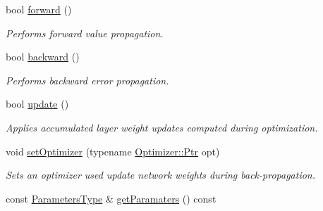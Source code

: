\begin{DoxyCompactItemize}
bool \hyperlink{classffnn_1_1layer_1_1_local_convolution_ad0f643595b7c35e669d41b77c68143df}{forward} ()
\begin{DoxyCompactList}\small\item\em Performs forward value propagation. \end{DoxyCompactList}\item 
bool \hyperlink{classffnn_1_1layer_1_1_local_convolution_aa59a3093b68dc8001eaff1f6eef72fc9}{backward} ()
\begin{DoxyCompactList}\small\item\em Performs backward error propagation. \end{DoxyCompactList}\item 
bool \hyperlink{classffnn_1_1layer_1_1_local_convolution_a47bfd391c37cc6b5c14fa37c30bff025}{update} ()
\begin{DoxyCompactList}\small\item\em Applies accumulated layer weight updates computed during optimization. \end{DoxyCompactList}\item 
void \hyperlink{classffnn_1_1layer_1_1_local_convolution_accffb54b2bf71c6db52ac7bf3a2444f1}{set\-Optimizer} (typename \hyperlink{classffnn_1_1optimizer_1_1_optimizer_ac03e7181934bf0c12a97fc67a60484ab}{Optimizer\-::\-Ptr} opt)
\begin{DoxyCompactList}\small\item\em Sets an optimizer used update network weights during back-\/propagation. \end{DoxyCompactList}\item 
const \hyperlink{classffnn_1_1layer_1_1_local_convolution_a09a482b44ecab19df4547526fb9b8321}{Parameters\-Type} \& \hyperlink{classffnn_1_1layer_1_1_local_convolution_a344dedf3ab0c0b2bec77b74975075d0c}{get\-Paramaters} () const 
\end{DoxyCompactItemize}
